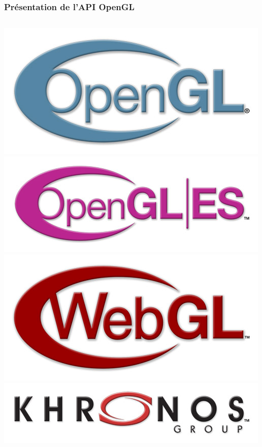 \begin{frame}
  \frametitle{Présentation de l'API OpenGL}
  \begin{columns}
    \begin{column}{.2\textwidth}
      \begin{center}
        \includegraphics[width=1.\textwidth]{images/khronos-logos/OpenGL/OpenGL_500.jpg} \\
        \includegraphics[width=1.\textwidth]{images/khronos-logos/OpenGL_ES/OpenGL-ES_500.jpg} \\
        \includegraphics[width=1.\textwidth]{images/khronos-logos/WebGL/WebGL_500.jpg} \\
        \includegraphics[width=1.\textwidth]{images/khronos-logos/Khronos_Group/Khronos_Group_500.jpg}

\end{center}
\end{column}
\end{columns}
\end{frame}
